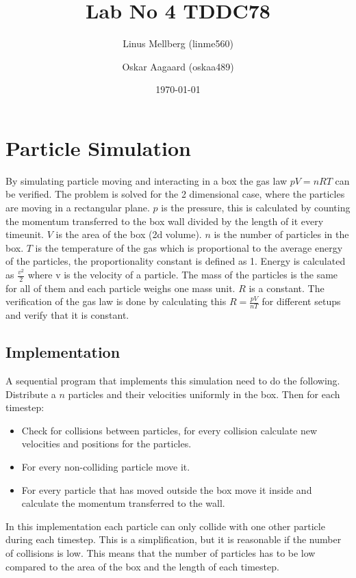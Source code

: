 \documentclass[a4paper,11pt]{article}
\begin{document}
\title{Lab No 4 TDDC78}
\author{Linus Mellberg (linme560) \and Oskar Aagaard (oskaa489)}
\date{\today}
\maketitle
\pagebreak
\thispagestyle{tcr}
\pagestyle{tcr}

\section{Particle Simulation}
By simulating particle moving and interacting in a box the gas law $pV = nRT$ can be verified.
The problem is solved for the 2 dimensional case, where the particles are moving in a rectangular plane.
$p$ is the pressure, this is calculated by counting the momentum transferred to the box wall divided by the length of it every timeunit.
$V$ is the area of the box (2d volume).
$n$ is the number of particles in the box.
$T$ is the temperature of the gas which is proportional to the average energy of the particles, the proportionality constant is defined as 1.
Energy is calculated as $\frac{v^2}{2}$ where v is the velocity of a particle.
The mass of the particles is the same for all of them and each particle weighs one mass unit.
$R$ is a constant.
The verification of the gas law is done by calculating this $R=\frac{pV}{nT}$ for different setups and verify that it is constant.

\subsection{Implementation}
A sequential program that implements this simulation need to do the following.
Distribute a $n$ particles and their velocities uniformly in the box.
Then for each timestep:
\begin{itemize}
  \item Check for collisions between particles, for every collision calculate new velocities and positions for the particles.
  \item For every non-colliding particle move it.
  \item For every particle that has moved outside the box move it inside and calculate the momentum transferred to the wall.
\end{itemize}
In this implementation each particle can only collide with one other particle during each timestep.
This is a simplification, but it is reasonable if the number of collisions is low.
This means that the number of particles has to be low compared to the area of the box and the length of each timestep.
\end{document}
